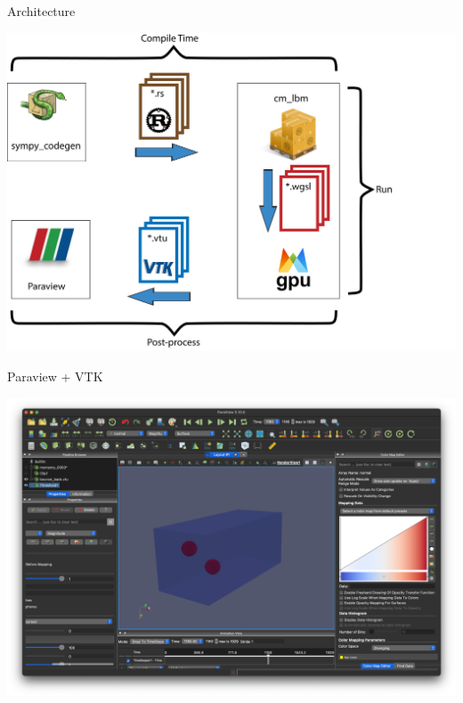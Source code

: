 \begin{frame}{Architecture}
  \begin{center}
  \centering
  \includegraphics[width=0.7\linewidth]{workflow.png}
  \end{center}
\end{frame}

\begin{frame}{Paraview + VTK}
\begin{center}
\centering
\includegraphics[width=0.7\linewidth]{example_1_paraview.png}
\end{center}
\end{frame}
